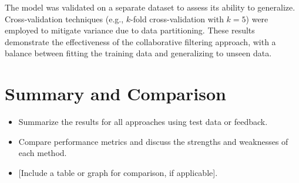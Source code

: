 \documentclass[a4paper,9pt]{article}
\begin{document}
The model was validated on a separate dataset to assess its ability to generalize.
Cross-validation techniques (e.g., \(k\)-fold cross-validation with \(k=5\)) were employed to mitigate variance due to data partitioning.
These results demonstrate the effectiveness of the collaborative filtering approach, with a balance between
fitting the training data and generalizing to unseen data.

\clearpage
\section{Summary and Comparison}

\begin{itemize}
	\item Summarize the results for all approaches using test data or feedback.
	\item Compare performance metrics and discuss the strengths and weaknesses of each method.
	\item{} [Include a table or graph for comparison, if applicable].
\end{itemize}
\end{document}
